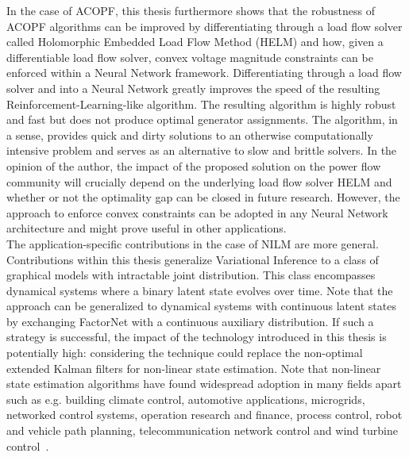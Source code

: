 \documentclass[11pt]{cmuthesis} %
\begin{document}
In the case of ACOPF, this thesis furthermore shows that the robustness of ACOPF algorithms can be improved by differentiating through a load flow solver called Holomorphic Embedded Load Flow Method (HELM) and how, given a differentiable load flow solver, convex voltage magnitude constraints can be enforced within a Neural Network framework. Differentiating through a load flow solver and into a Neural Network greatly improves the speed of the resulting Reinforcement-Learning-like algorithm. The resulting algorithm is highly robust and fast but does not produce optimal generator assignments. The algorithm, in a sense, provides quick and dirty solutions to an otherwise computationally intensive problem and serves as an alternative to slow and brittle solvers. In the opinion of the author, the impact of the proposed solution on the power flow community will crucially depend on the underlying load flow solver HELM and whether or not the optimality gap can be closed in future research. However, the approach to enforce convex constraints can be adopted in any Neural Network architecture and might prove useful in other applications.\\

The application-specific contributions in the case of NILM are more general. Contributions within this thesis generalize Variational Inference to a class of graphical models with intractable joint distribution. This class encompasses dynamical systems where a binary latent state evolves over time. Note that the approach can be generalized to dynamical systems with continuous latent states by exchanging FactorNet with a continuous auxiliary distribution. If such a strategy is successful, the impact of the technology introduced in this thesis is potentially high: considering the technique could replace the non-optimal extended Kalman filters for non-linear state estimation. Note that non-linear state estimation algorithms have found widespread adoption in many fields apart such as e.g. building climate control, automotive applications, microgrids, networked control systems, operation research and finance, process control, robot and vehicle path planning, telecommunication network control and wind turbine control~\cite{mesbah2016stochastic}.



\end{document}
